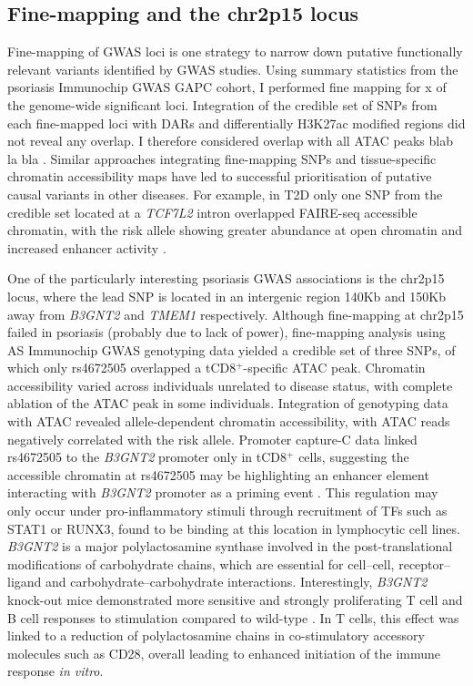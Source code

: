 \subsection{Fine-mapping and the chr2p15 locus}
Fine-mapping of GWAS loci is one strategy to narrow down putative functionally relevant variants identified by GWAS studies. Using summary statistics from the psoriasis Immunochip GWAS GAPC cohort, I performed fine mapping for x of the genome-wide significant loci. Integration of the credible set of SNPs from each fine-mapped loci with DARs and differentially H3K27ac modified regions did not reveal any overlap.  I therefore considered overlap with all ATAC peaks blab la bla . Similar approaches integrating fine-mapping SNPs and tissue-specific chromatin accessibility maps have led to successful prioritisation of putative causal variants in other diseases. For example, in T2D only one SNP from the credible set located at a \textit{TCF7L2} intron overlapped FAIRE-seq accessible chromatin, with the risk allele showing greater abundance at open chromatin and increased enhancer activity \parencite{Gaulton2010, Stefan2014}.

One of the particularly interesting psoriasis GWAS associations is the chr2p15 locus, where the lead SNP is located in an intergenic region 140Kb and 150Kb away from \textit{B3GNT2} and \textit{TMEM1} respectively. Although fine-mapping at chr2p15 failed in psoriasis (probably due to lack of power), fine-mapping analysis using AS Immunochip GWAS genotyping data yielded a credible set of three SNPs, of which only rs4672505 overlapped a tCD8$^+$-specific ATAC peak. Chromatin accessibility varied across individuals unrelated to disease status, with complete ablation of the ATAC peak in some individuals. Integration of genotyping data with ATAC revealed allele-dependent chromatin accessibility, with ATAC reads negatively correlated with the risk allele. Promoter capture-C data linked rs4672505 to the \textit{B3GNT2} promoter only in tCD8$^+$ cells, suggesting the accessible chromatin at rs4672505 may be highlighting an enhancer element interacting with \textit{B3GNT2} promoter as a priming event \parencite{Javiere2016}. This regulation may only occur under pro-inflammatory stimuli through recruitment of TFs such as STAT1 or RUNX3, found to be binding at this location in lymphocytic cell lines. \textit{B3GNT2} is a major polylactosamine synthase involved in the post-translational modifications of carbohydrate chains, which are essential for cell–cell, receptor–ligand and carbohydrate–carbohydrate interactions. Interestingly, \textit{B3GNT2} knock-out mice demonstrated more sensitive  and strongly proliferating T cell and B cell responses to stimulation compared to wild-type \parencite{Togayachi2010}. In T cells, this effect was linked to a reduction of polylactosamine chains in co-stimulatory accessory molecules such as CD28, overall leading to enhanced initiation of the immune response \textit{in vitro}. 

